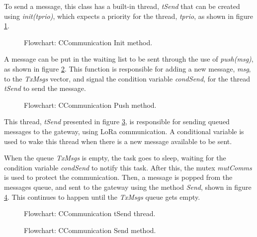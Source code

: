 To send a message, this class has a built-in thread, \textit{tSend} that can be created using \textit{init(tprio)}, which expects a priority for the thread, \textit{tprio}, as shown in figure \ref{fig:CCommunicationinit}.

\begin{figure}[H]
	\centering
	\caption{Flowchart: CCommunication Init method.}
	\label{fig:CCommunicationinit}
\end{figure}

A message can be put in the waiting list to be sent through the use of \textit{push(msg)}, as shown in figure \ref{fig:CCommunicationPush}. This function is responsible for adding a new message, \textit{msg}, to the \textit{TxMsgs} vector, and signal the condition variable \textit{condSend}, for the thread \textit{tSend} to send the message.

\begin{figure}[H]
	\centering
	\caption{Flowchart: CCommunication Push method.}
	\label{fig:CCommunicationPush}
\end{figure}

This thread, \textit{tSend} presented in figure \ref{fig:CCommunicationtsend}, is responsible for sending queued messages to the gateway, using LoRa communication. A conditional variable is used to wake this thread when there is a new message available to be sent.

When the queue \textit{TxMsgs} is empty, the task goes to sleep, waiting for the condition variable \textit{condSend} to notify this task. After this, the mutex \textit{mutComms} is used to protect the communication. Then, a message is popped from the messages queue, and sent to the gateway using the method \textit{Send}, shown in figure \ref{fig:CCommunicationsend}. This continues to happen until the \textit{TxMsgs} queue gets empty.

\begin{figure}[H]
	\centering
	\caption{Flowchart: CCommunication tSend thread.}
	\label{fig:CCommunicationtsend}
\end{figure}

\begin{figure}[H]
	\centering
	\caption{Flowchart: CCommunication Send method.}
	\label{fig:CCommunicationsend}
\end{figure}

